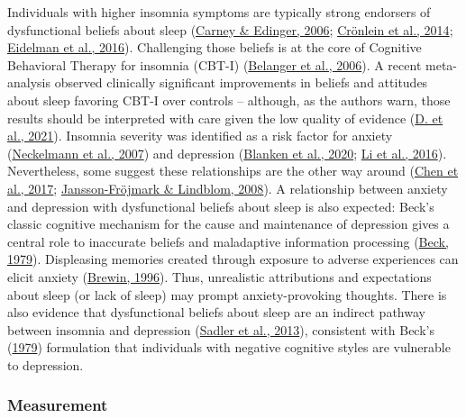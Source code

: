 \documentclass[
  ,doc,11pt, twoside,floatsintext]{apa6}
\begin{document}
Individuals with higher insomnia symptoms are typically strong endorsers of dysfunctional beliefs about sleep (\protect\hyperlink{ref-carney2006}{Carney \& Edinger, 2006}; \protect\hyperlink{ref-cronlein2014}{Crönlein et al., 2014}; \protect\hyperlink{ref-eidelman2016}{Eidelman et al., 2016}). Challenging those beliefs is at the core of Cognitive Behavioral Therapy for insomnia (CBT-I) (\protect\hyperlink{ref-belanger2006}{Belanger et al., 2006}). A recent meta-analysis observed clinically significant improvements in beliefs and attitudes about sleep favoring CBT-I over controls -- although, as the authors warn, those results should be interpreted with care given the low quality of evidence (\protect\hyperlink{ref-edingerjackd.2021}{D. et al., 2021}). Insomnia severity was identified as a risk factor for anxiety (\protect\hyperlink{ref-neckelmann2007}{Neckelmann et al., 2007}) and depression (\protect\hyperlink{ref-blanken2020}{Blanken et al., 2020}; \protect\hyperlink{ref-li2016}{Li et al., 2016}). Nevertheless, some suggest these relationships are the other way around (\protect\hyperlink{ref-chen2017}{Chen et al., 2017}; \protect\hyperlink{ref-jansson-frojmark2008b}{Jansson-Fröjmark \& Lindblom, 2008}). A relationship between anxiety and depression with dysfunctional beliefs about sleep is also expected: Beck's classic cognitive mechanism for the cause and maintenance of depression gives a central role to inaccurate beliefs and maladaptive information processing (\protect\hyperlink{ref-beck1979cognitive}{Beck, 1979}). Displeasing memories created through exposure to adverse experiences can elicit anxiety (\protect\hyperlink{ref-brewin1996theoretical}{Brewin, 1996}). Thus, unrealistic attributions and expectations about sleep (or lack of sleep) may prompt anxiety-provoking thoughts. There is also evidence that dysfunctional beliefs about sleep are an indirect pathway between insomnia and depression (\protect\hyperlink{ref-sadler2013}{Sadler et al., 2013}), consistent with Beck's (\protect\hyperlink{ref-beck1979cognitive}{1979}) formulation that individuals with negative cognitive styles are vulnerable to depression.

\hypertarget{measurement}{%
\subsubsection{Measurement}\label{measurement}}
\end{document}
